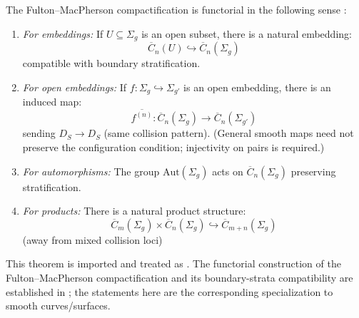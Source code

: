 \begin{theorem}\label{thm:FM-functorial}
The Fulton--MacPherson compactification is functorial in the following
sense \cite{FM94}:

\begin{enumerate}
\item \emph{For embeddings:} If $U \subseteq \Sigma_g$ is an open subset, there is a natural embedding:
\[\overline{C}_n(U) \hookrightarrow \overline{C}_n(\Sigma_g)\]
compatible with boundary stratification.

\item \emph{For open embeddings:} If $f: \Sigma_g \hookrightarrow \Sigma_{g'}$ is an open embedding, there is an induced map:
\[\overline{f^{(n)}}: \overline{C}_n(\Sigma_g) \to \overline{C}_n(\Sigma_{g'})\]
sending $D_S \to D_S$ (same collision pattern).  (General smooth maps need not preserve the configuration condition; injectivity on pairs is required.)

\item \emph{For automorphisms:} The group $\text{Aut}(\Sigma_g)$ acts on $\overline{C}_n(\Sigma_g)$ preserving stratification.

\item \emph{For products:} There is a natural product structure:
\[\overline{C}_m(\Sigma_g) \times \overline{C}_n(\Sigma_g) \hookrightarrow \overline{C}_{m+n}(\Sigma_g)\]
(away from mixed collision loci)
\end{enumerate}
\end{theorem}

\begin{remark}
This theorem is imported and treated as \ClaimStatusProvedElsewhere. The
functorial construction of the Fulton--MacPherson compactification and its
boundary-strata compatibility are established in \cite{FM94}; the statements
here are the corresponding specialization to smooth curves/surfaces.
\end{remark}

